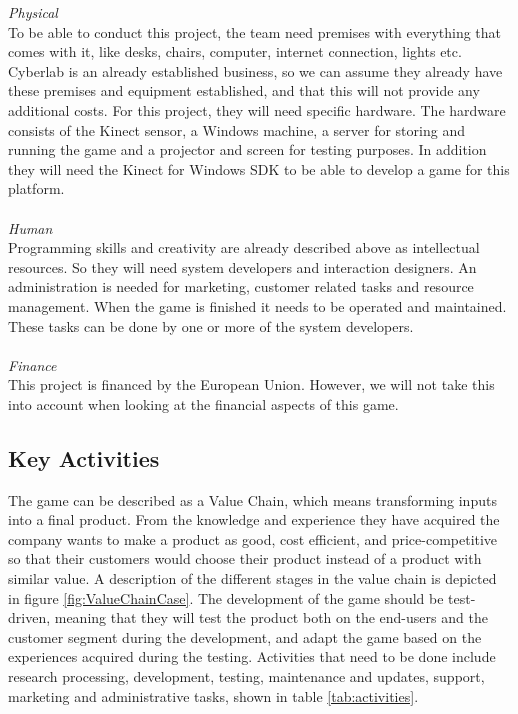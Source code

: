 \emph{Physical} \\ To be able to conduct this project, the team need premises with everything that comes with it, like desks, chairs, computer, internet connection, lights etc. Cyberlab is an already established business, so we can assume they already have these premises and equipment established, and that this will not provide any additional costs. For this project, they will need specific hardware. The hardware consists of the Kinect sensor, a Windows machine, a server for storing and running the game and a projector and screen for testing purposes. In addition they will need the Kinect for Windows SDK to be able to develop a game for this platform.\\ \\
\emph{Human} \\ Programming skills and creativity are already described above as intellectual resources. So they will need system developers and interaction designers. An administration is needed for marketing, customer related tasks and resource management. When the game is finished it needs to be operated and maintained. These tasks can be done by one or more of the system developers. \\ \\
\emph{Finance} \\ This project is financed by the European Union. However, we will not take this into account when looking at the financial aspects of this game.

\subsection{Key Activities}
The game can be described as a Value Chain, which means transforming inputs into a final product. From the knowledge and experience they have acquired the company wants to make a product as good, cost efficient, and price-competitive so that their customers would choose their product instead of a product with similar value. A description of the different stages in the value chain is depicted in figure \ref{fig:ValueChainCase}. The development of the game should be test-driven, meaning that they will test the product both on the end-users and the customer segment during the development, and adapt the game based on the experiences acquired during the testing. Activities that need to be done include research processing, development, testing, maintenance and updates, support, marketing and administrative tasks, shown in table \ref{tab:activities}. 



